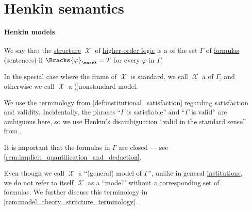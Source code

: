 \section{Henkin semantics}\label{sec:henkin_semantics}

\paragraph{Henkin models}

\begin{definition}\label{def:hol_model}
  We say that the \hyperref[def:hol_structure]{structure} \( \mscrX \) of \hyperref[def:higher_order_logic]{higher-order logic} is a  of the set \( \Gamma \) of \hyperref[def:hol_closed_expression]{ formulas} (sentences) if \( \Bracks{\varphi}_\mscrX = T \) for every \( \varphi \) in \( \Gamma \).

  In the special case where the frame of \( \mscrX \) is standard, we call \( \mscrX \) a  of \( \Gamma \), and otherwise we call \( \mscrX \) a \term[en=nonstandard (model) (\cite[255]{Andrews2002Logic})]{nonstandard model}.

  We use the terminology from \cref{def:institutional_satisfaction} regarding satisfaction and validity. Incidentally, the phrases \enquote{\( \Gamma \) is satisfiable} and \enquote{\( \Gamma \) is valid} are ambiguous here, so we use Henkin's disambiguation \enquote{valid in the standard sense} from \cite[84]{Henkin1950CompletenessInTheoryOfTypes}.
\end{definition}
\begin{comments}
  \item It is important that the formulas in \( \Gamma \) are closed --- see \cref{rem:implicit_quantification_and_deduction}.

  \item Even though we call \( \mscrX \) a \enquote{(general) model of \( \Gamma \)}, unlike in general \hyperref[def:institution]{institutions}, we do not refer to itself \( \mscrX \) as a \enquote{model} without a corresponding set of formulas. We further discuss this terminology in \cref{rem:model_theory_structure_terminology}.
\end{comments}
